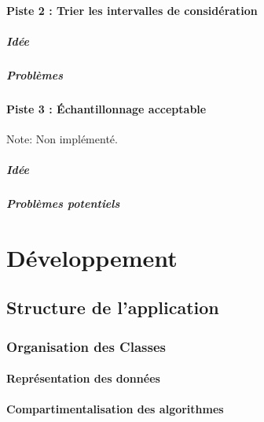 \documentclass[a4paper,10pt]{report}
\begin{document}
\subsection{Piste 2 : Trier les intervalles de considération}
\subsubsection{Idée}

\subsubsection{Problèmes}

\subsection{Piste 3 : Échantillonnage acceptable}
Note: Non implémenté.
\subsubsection{Idée}

\subsubsection{Problèmes potentiels}


\part{Développement}
\chapter{Structure de l'application}
\section{Organisation des Classes}
\subsection{Représentation des données}

\subsection{Compartimentalisation des algorithmes}
\end{document}
